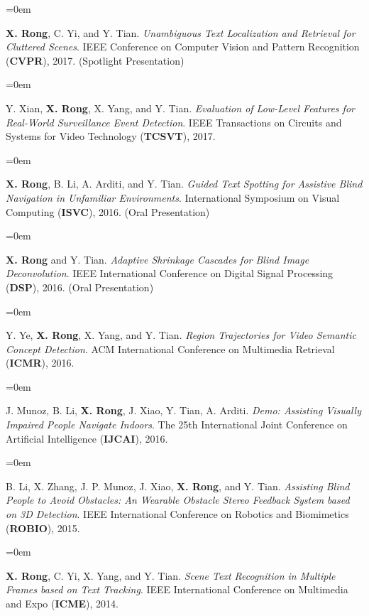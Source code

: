 \documentclass{scrartcl}
\newcommand{\Description}[1]{\hangindent=0em\hangafter=0\noindent\raggedright\footnotesize{#1}\par\normalsize\vspace{1em}} %
\begin{document}
\begin{cv}{}
\vspace{2.0em} %


\noindent{}\vspace{0.8em}

\Description{\textbf{X. Rong}, C. Yi, and Y. Tian. \textit{Unambiguous Text Localization and Retrieval for Cluttered Scenes}. IEEE Conference on Computer Vision and Pattern Recognition (\textbf{CVPR}), 2017. (Spotlight Presentation)}

\Description{Y. Xian, \textbf{X. Rong}, X. Yang, and Y. Tian. \textit{Evaluation of Low-Level Features for Real-World Surveillance Event Detection}. IEEE Transactions on Circuits and Systems for Video Technology (\textbf{TCSVT}), 2017.}

\Description{\textbf{X. Rong}, B. Li, A. Arditi, and Y. Tian. \textit{Guided Text Spotting for Assistive Blind Navigation in Unfamiliar Environments}. International Symposium on Visual Computing (\textbf{ISVC}), 2016. (Oral Presentation)}

\Description{\textbf{X. Rong} and Y. Tian. \textit{Adaptive Shrinkage Cascades for Blind Image Deconvolution}. IEEE International Conference on Digital Signal Processing (\textbf{DSP}), 2016. (Oral Presentation)}

\Description{Y. Ye, \textbf{X. Rong}, X. Yang, and Y. Tian. \textit{Region Trajectories for Video Semantic Concept Detection}. ACM International Conference on Multimedia Retrieval (\textbf{ICMR}), 2016.}

\Description{J. Munoz, B. Li, \textbf{X. Rong}, J. Xiao, Y. Tian, A. Arditi. \textit{Demo: Assisting Visually Impaired People Navigate Indoors}. The 25th International Joint Conference on Artificial Intelligence (\textbf{IJCAI}), 2016.}

\Description{B. Li, X. Zhang, J. P. Munoz, J. Xiao, \textbf{X. Rong}, and Y. Tian. \textit{Assisting Blind People to Avoid Obstacles: An Wearable Obstacle Stereo Feedback System based on 3D Detection}. IEEE International Conference on Robotics and Biomimetics (\textbf{ROBIO}), 2015.}

\Description{\textbf{X. Rong}, C. Yi, X. Yang, and Y. Tian. \textit{Scene Text Recognition in Multiple Frames based on Text Tracking}. IEEE International Conference on Multimedia and Expo (\textbf{ICME}), 2014.}


\end{cv}
\end{document}
